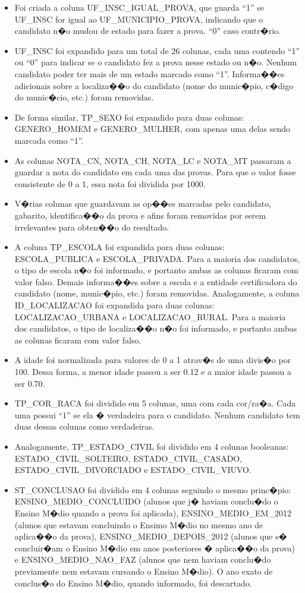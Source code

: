 \documentclass[12pt]{article}
\begin{document}
\begin{itemize}
    \item Foi criada a coluna UF\_INSC\_IGUAL\_PROVA, que guarda ``1'' se UF\_INSC for igual ao UF\_MUNICIPIO\_PROVA, indicando que o candidato n�o mudou de estado para fazer a prova. ``0'' caso contr�rio.
    \item UF\_INSC foi expandido para um total de 26 colunas, cada uma contendo ``1'' ou ``0'' para indicar se o candidato fez a prova nesse estado ou n�o. Nenhum candidato poder ter mais de um estado marcado como ``1''. Informa��es adicionais sobre a localiza��o do candidato (nome do munic�pio, c�digo do munic�cio, etc.) foram removidas.
    \item De forma similar, TP\_SEXO foi expandido para duas colunas: GENERO\_HOMEM e GENERO\_MULHER, com apenas uma delas sendo marcada como ``1''.
    \item As colunas NOTA\_CN, NOTA\_CH, NOTA\_LC e NOTA\_MT passaram a guardar a nota do candidato em cada uma das provas. Para que o valor fosse consistente de 0 a 1, essa nota foi dividida por 1000.
    \item V�rias colunas que guardavam as op��es marcadas pelo candidato, gabarito, identifica��o da prova e afins foram removidas por serem irrelevantes para obten��o do resultado.
    \item A coluna TP\_ESCOLA foi expandida para duas colunas: ESCOLA\_PUBLICA e ESCOLA\_PRIVADA. Para a maioria dos candidatos, o tipo de escola n�o foi informado, e portanto ambas as colunas ficaram com valor falso. Demais informa��es sobre a escola e a entidade certificadora do candidato (nome, munic�pio, etc.) foram removidas.
    Analogamente, a coluna  ID\_LOCALIZACAO foi expandida para duas colunas: LOCALIZACAO\_URBANA e LOCALIZACAO\_RURAL. Para a maioria dos candidatos, o tipo de localiza��o n�o foi informado, e portanto ambas as colunas ficaram com valor falso.
    \item A idade foi normalizada para valores de 0 a 1 atrav�s de uma divis�o por 100. Dessa forma, a menor idade passou a ser 0.12 e a maior idade passou a ser 0.70.
    \item TP\_COR\_RACA foi dividido em 5 colunas, uma com cada cor/ra�a. Cada uma possui ``1'' se ela � verdadeira para o candidato. Nenhum candidato tem duas dessas colunas como verdadeiras.
    \item Analogamente, TP\_ESTADO\_CIVIL foi dividido em 4 colunas booleanas: ESTADO\_CIVIL\_SOLTEIRO, ESTADO\_CIVIL\_CASADO, ESTADO\_CIVIL\_DIVORCIADO e ESTADO\_CIVIL\_VIUVO.
    \item ST\_CONCLUSAO foi dividido em 4 colunas seguindo o mesmo princ�pio: ENSINO\_MEDIO\_CONCLUIDO (alunos que j� haviam conclu�do o Ensino M�dio quando a prova foi aplicada), ENSINO\_MEDIO\_EM\_2012 (alunos que estavam concluindo o Ensimo M�dio no mesmo ano de aplica��o da prova), ENSINO\_MEDIO\_DEPOIS\_2012 (alunos que s� concluir�am o Ensino M�dio em anos posteriores � aplica��o da prova) e ENSINO\_MEDIO\_NAO\_FAZ (alunos que nem haviam conclu�do previamente nem estavam cursando o Ensino M�dio). O ano exato de conclus�o do Ensino M�dio, quando informado, foi descartado.
\end{itemize}
\end{document}
